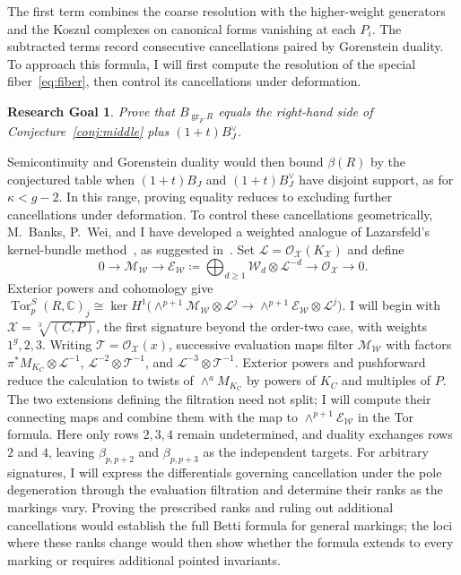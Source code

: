 \documentclass[11pt,reqno]{amsart}
\newtheorem{goal}[lemma]{Research Goal}
\theoremstyle{remark}
\newcommand{\Tor}{\operatorname{Tor}}
\newcommand{\CC}{\mathbb{C}}
\newcommand{\cE}{\mathcal{E}}
\newcommand{\cL}{\mathcal{L}}
\newcommand{\cM}{\mathcal{M}}
\newcommand{\cO}{\mathcal{O}}
\newcommand{\cT}{\mathcal{T}}
\newcommand{\cW}{\mathcal{W}}
\newcommand{\cX}{\mathcal{X}}
\begin{document}
The first term combines the coarse resolution with the higher-weight generators and the Koszul complexes on canonical forms vanishing at each $P_i$. The subtracted terms record consecutive cancellations paired by Gorenstein duality. To approach this formula, I will first compute the resolution of the special fiber~\eqref{eq:fiber}, then control its cancellations
under deformation.

\begin{goal}\label{goal:special-fiber}
Prove that $B_{\operatorname{gr}_F R}$ equals the right-hand side of Conjecture~\ref{conj:middle} plus $(1+t)B_J^\vee$.
\end{goal}

Semicontinuity and Gorenstein duality would then bound $\beta(R)$ by the conjectured table when $(1+t)B_J$ and $(1+t)B_J^\vee$ have disjoint support, as for $\kappa<g-2$. In this range, proving equality reduces to excluding further cancellations under deformation. To control these cancellations geometrically, M.~Banks, P.~Wei, and I have developed a weighted analogue of Lazarsfeld's kernel-bundle method~\cite{lazarsfeld89,greenLazarsfeld88}, as suggested in~\cite[\S7.3]{brownErman25}. Set $\cL=\cO_{\cX}(K_{\cX})$ and define
\[
0\longrightarrow\cM_{\cW}\longrightarrow
\cE_{\cW}\coloneqq\bigoplus_{d\geq1}\cW_d\otimes\cL^{-d}
\longrightarrow\cO_{\cX}\longrightarrow0.
\]
Exterior powers and cohomology give
$\Tor_p^S(R,\CC)_j\cong
\ker H^1\!\bigl(
\wedge^{p+1}\cM_{\cW}\otimes\cL^j
\to
\wedge^{p+1}\cE_{\cW}\otimes\cL^j
\bigr)$. I will begin with $\cX=\sqrt[3]{(C,P)}$, the first signature beyond the order-two case, with weights $1^g,2,3$. Writing $\cT=\cO_{\cX}(x)$, successive evaluation maps filter $\cM_{\cW}$ with factors $\pi^*M_{K_C}\otimes\cL^{-1}$, $\cL^{-2}\otimes\cT^{-1}$, and $\cL^{-3}\otimes\cT^{-1}$. Exterior powers and pushforward reduce the calculation to twists of $\wedge^aM_{K_C}$ by powers of $K_C$ and multiples of $P$. The two extensions defining the filtration need not split; I will compute their connecting maps and combine them with the map to $\wedge^{p+1}\cE_{\cW}$ in the Tor formula. Here only rows $2,3,4$ remain undetermined, and duality exchanges rows $2$ and $4$, leaving $\beta_{p,p+2}$ and $\beta_{p,p+3}$ as the independent targets. For arbitrary signatures, I will express the differentials governing cancellation under the pole degeneration through the evaluation filtration and determine their ranks as the markings vary. Proving the prescribed ranks and ruling out additional cancellations would establish the full Betti formula for general markings; the loci where these ranks change would then show whether the formula extends to every marking or requires additional pointed invariants.
\end{document}
